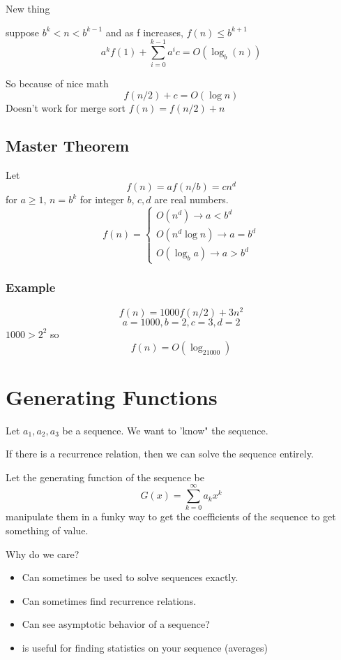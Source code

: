 \documentclass{report}
\begin{document}
New thing

suppose $b^k < n < b^{k-1}$ and 
as f increases, $f(n) \leq b^{k+1}$
\[
a^kf(1) + \sum^{k-1}_{i=0}a^ic
=
O(\log_b(n))
\]

So because of nice math
\[
f(n/2) + c 
=
O(\log n)
\]
Doesn't work for merge sort $f(n) = f(n/2) + n$

\section{Master Theorem}
Let
\[
f(n) = af(n/b) = cn^d
\]
for $a \geq 1$, $n = b^k$ for integer $b$, $c, d$ are real numbers.
\[
f(n)
=
\begin{cases}
O(n^d) \rightarrow a < b^d \\ 
O(n^d\log n) \rightarrow a = b^d \\
O(\log_ba) \rightarrow a > b^d
\end{cases}
\]

\subsection{Example}
\[
f(n) = 1000f(n/2) + 3n^2
\]
\[
a = 1000, 
b = 2,
c = 3, 
d = 2
\]
$1000 > 2^2$ so 
\[
f(n) = O(\log_21000)
\]


\chapter{Generating Functions}
Let $a_1, a_2, a_3$ be a sequence. We want to 'know" the sequence.

If there is a recurrence relation, then we can solve the sequence entirely.

Let the generating function of the sequence be
\[
G(x) = \sum^\infty_{k = 0}a_kx^k
\]
manipulate them in a funky way to get the coefficients of the sequence to get something of value.

Why do we care?

\begin{itemize}
\item
Can sometimes be used to solve sequences exactly. 

\item
Can sometimes find recurrence relations.

\item
Can see asymptotic behavior of a sequence?

\item
is useful for finding statistics on your sequence (averages)
\end{itemize}
\end{document}
